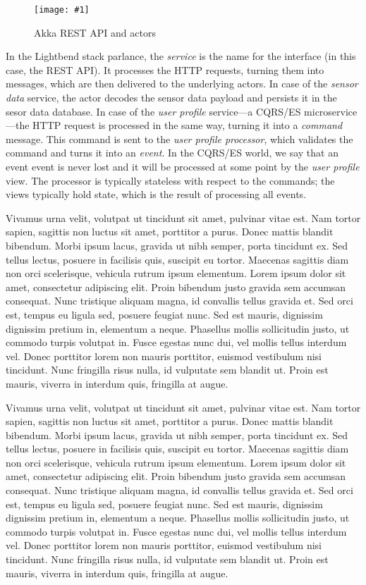 \documentclass[a4paper, 10 pt, conference]{IEEEtran}
\newcommand{\fig}[3]{
  \begin{figure}[h]
    \begin{center}
        \caption{#3}
        \texttt{[image: \#1]}
        \label{fig:#2}
    \end{center}
  \end{figure}
}
\begin{document}
\fig{ri-akka-actors.png}{ri-akka-actors}{Akka REST API and actors}

In the Lightbend stack parlance, the \emph{service} is the name for the interface (in this case, the REST API). It processes the HTTP requests, turning them into messages, which are then delivered to the underlying actors. In case of the \emph{sensor data} service, the actor decodes the sensor data payload and persists it in the sesor data database. In case of the \emph{user profile} service---a CQRS/ES microservice---the HTTP request is processed in the same way, turning it into a \emph{command} message. This command is sent to the \emph{user profile processor}, which validates the command and turns it into an \emph{event}. In the CQRS/ES world, we say that an event event is never lost and it will be processed at some point by the \emph{user profile} view. The processor is typically stateless with respect to the commands; the views typically hold state, which is the result of processing all events.

Vivamus urna velit, volutpat ut tincidunt sit amet, pulvinar vitae est. Nam tortor sapien, sagittis non luctus sit amet, porttitor a purus. Donec mattis blandit bibendum. Morbi ipsum lacus, gravida ut nibh semper, porta tincidunt ex. Sed tellus lectus, posuere in facilisis quis, suscipit eu tortor. Maecenas sagittis diam non orci scelerisque, vehicula rutrum ipsum elementum. Lorem ipsum dolor sit amet, consectetur adipiscing elit. Proin bibendum justo gravida sem accumsan consequat. Nunc tristique aliquam magna, id convallis tellus gravida et. Sed orci est, tempus eu ligula sed, posuere feugiat nunc. Sed est mauris, dignissim dignissim pretium in, elementum a neque. Phasellus mollis sollicitudin justo, ut commodo turpis volutpat in. Fusce egestas nunc dui, vel mollis tellus interdum vel. Donec porttitor lorem non mauris porttitor, euismod vestibulum nisi tincidunt. Nunc fringilla risus nulla, id vulputate sem blandit ut. Proin est mauris, viverra in interdum quis, fringilla at augue.

Vivamus urna velit, volutpat ut tincidunt sit amet, pulvinar vitae est. Nam tortor sapien, sagittis non luctus sit amet, porttitor a purus. Donec mattis blandit bibendum. Morbi ipsum lacus, gravida ut nibh semper, porta tincidunt ex. Sed tellus lectus, posuere in facilisis quis, suscipit eu tortor. Maecenas sagittis diam non orci scelerisque, vehicula rutrum ipsum elementum. Lorem ipsum dolor sit amet, consectetur adipiscing elit. Proin bibendum justo gravida sem accumsan consequat. Nunc tristique aliquam magna, id convallis tellus gravida et. Sed orci est, tempus eu ligula sed, posuere feugiat nunc. Sed est mauris, dignissim dignissim pretium in, elementum a neque. Phasellus mollis sollicitudin justo, ut commodo turpis volutpat in. Fusce egestas nunc dui, vel mollis tellus interdum vel. Donec porttitor lorem non mauris porttitor, euismod vestibulum nisi tincidunt. Nunc fringilla risus nulla, id vulputate sem blandit ut. Proin est mauris, viverra in interdum quis, fringilla at augue.
\end{document}
